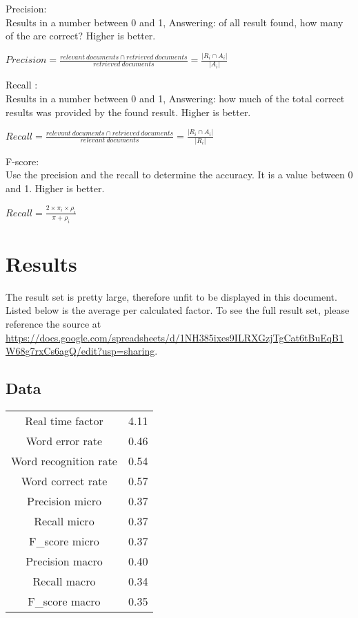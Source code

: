 \documentclass{article}
\begin{document}
    Precision: \\
    Results in a number between 0 and 1, Answering: of all result found, how many of the are correct? Higher is better.
    \begin{center}
    $ Precision = \frac{relevant\ documents \cap retrieved\ documents}{retrieved\ documents} = \frac{|R_i \cap A_i|}{|A_i|} $ \\
    \end{center} 
    
    Recall : \\
    Results in a number between 0 and 1, Answering: how much of the total correct results was provided by the found result. Higher is better.
    \begin{center}
    $ Recall = \frac{relevant\ documents \cap retrieved\ documents}{relevant\ documents} = \frac{|R_i \cap A_i|}{|R_i|} $ \\
    \end{center} 
    
    F-score: \\
    Use the precision and the recall to determine the accuracy. It is a value between 0 and 1. Higher is better.
    \begin{center}
    $ Recall = \frac{2 \times \pi_i \times \rho_i}{\pi + \rho_i} $\\
    \end{center} 


\newpage
\section{Results}
The result set is pretty large, therefore unfit to be displayed in this document. Listed below is the average per calculated factor. To see the full result set, please reference the source at \url{https://docs.google.com/spreadsheets/d/1NH385ixes9ILRXGzjTgCat6tBuEqB1W68g7rxCs6agQ/edit?usp=sharing}.
\subsection{Data}

\begin{center}
\begin{tabular}{ |c|c| } 
 \hline
 Real time factor & 4.11 \\ 
 Word error rate & 0.46 \\ 
 Word recognition rate & 0.54 \\ 
 Word correct rate & 0.57 \\ 
 Precision micro & 0.37 \\ 
 Recall micro & 0.37 \\ 
 F\_score micro & 0.37 \\  
 Precision macro & 0.40 \\  
 Recall macro & 0.34 \\  
 F\_score macro & 0.35 \\   
 \hline
\end{tabular}
\end{center}
\end{document}
